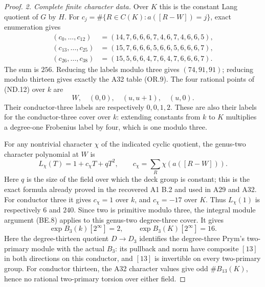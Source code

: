 \documentclass[11pt,a4paper]{article}
\begin{document}
\begin{proof}
\emph{2. Complete finite character data.}
Over $K$ this is the constant Lang quotient of $G$ by $H$.
For $c_j=\#\{R\in C(K):a([R-W])=j\}$, exact enumeration gives
\[
\begin{aligned}
 (c_0,\ldots,c_{12})&=(14,7,6,6,6,7,4,6,7,4,6,6,5),\\
 (c_{13},\ldots,c_{25})&=(15,7,6,6,6,5,6,6,5,6,6,6,7),\\
 (c_{26},\ldots,c_{38})&=(15,5,6,6,4,7,6,4,7,6,6,6,7).
\end{aligned}
 \tag{ND.17}
\]
The sum is $256$. Reducing the labels modulo three gives
$(74,91,91)$; reducing modulo thirteen gives exactly the A32
table (OR.9). The four rational points of (ND.12) over $k$ are
\[
              W,\quad(0,0),\quad(u,u+1),\quad(u,0).
\]
Their conductor-three labels are respectively $0,0,1,2$.
These are also their labels for the conductor-three cover
over $k$: extending constants from $k$ to $K$ multiplies a
degree-one Frobenius label by four, which is one modulo three.

For any nontrivial character $\chi$ of the indicated cyclic
quotient, the genus-two character polynomial at $W$ is
\[
         L_\chi(T)=1+c_\chi T+qT^2,
             \qquad c_\chi=\sum_R\chi(a([R-W])).
 \tag{ND.18}
\]
Here $q$ is the size of the field over which the deck group is
constant; this is the exact formula already proved in the
recovered A1 B.2 and used in A29 and A32. For conductor three
it gives $c_\chi=1$ over $k$, and $c_\chi=-17$ over $K$.
Thus $L_\chi(1)$ is respectively $6$ and $240$.
Since two is primitive modulo three, the integral module
argument (BE.8) applies to this genus-two degree-three cover.
It gives
\[
              \exp B_3(k)[2^\infty]=2,
                 \qquad \exp B_3(K)[2^\infty]=16.
 \tag{ND.19}
\]
Here the degree-thirteen quotient $D\to D_3$ identifies the
degree-three Prym's two-primary module with the actual $B_3$:
its pullback and norm have composite $[13]$ in both directions
on this conductor, and $[13]$ is invertible on every two-primary
group.
For conductor thirteen, the A32 character values give odd
$\#B_{13}(K)$, hence no rational two-primary torsion over
either field.


\end{proof}
\end{document}
